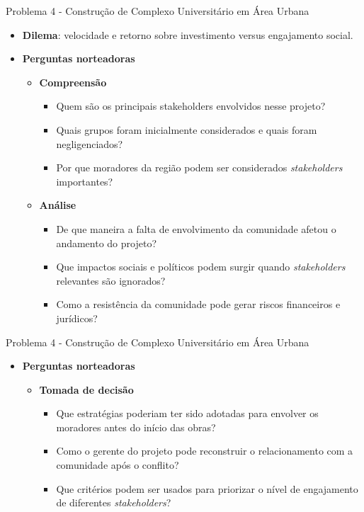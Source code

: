 \documentclass{beamer}
\begin{document}
\begin{frame}{Problema 4 - Construção de Complexo Universitário em Área Urbana}
	\begin{itemize}
		\justifying
		\item \textbf{Dilema}: velocidade e retorno sobre investimento versus engajamento social.
		\item \textbf{Perguntas norteadoras}
		\begin{itemize}
			\item \textbf{Compreensão}
				\begin{itemize}
					\justifying
					\item Quem são os principais stakeholders envolvidos nesse projeto?
					\item Quais grupos foram inicialmente considerados e quais foram negligenciados?
					\item Por que moradores da região podem ser considerados \textit{stakeholders} importantes?
				\end{itemize}
			\item \textbf{Análise}
				\begin{itemize}
					\justifying
					\item De que maneira a falta de envolvimento da comunidade afetou o andamento do projeto?
					\item Que impactos sociais e políticos podem surgir quando \textit{stakeholders} relevantes são ignorados?
					\item Como a resistência da comunidade pode gerar riscos financeiros e jurídicos?
				\end{itemize}
		\end{itemize}
	\end{itemize}
\end{frame}

\begin{frame}{Problema 4 - Construção de Complexo Universitário em Área Urbana}
	\begin{itemize}
		\justifying
		\item \textbf{Perguntas norteadoras}
		\begin{itemize}
			\item \textbf{Tomada de decisão}
			\begin{itemize}
				\justifying
				\item Que estratégias poderiam ter sido adotadas para envolver os moradores antes do início das obras?
				\item Como o gerente do projeto pode reconstruir o relacionamento com a comunidade após o conflito?
				\item Que critérios podem ser usados para priorizar o nível de engajamento de diferentes \textit{stakeholders}?
			\end{itemize}
		\end{itemize}
	\end{itemize}
\end{frame}
\end{document}
